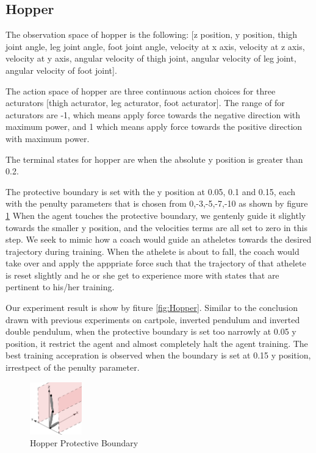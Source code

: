 \documentclass[journal]{IEEEtran}
\begin{document}
\subsection{Hopper}
The observation space of hopper is the following: [z position, y position, thigh joint angle, leg joint angle, foot joint angle, velocity at x axis, velocity at z axis, velocity at y axis, angular velocity of thigh joint, angular velocity of leg joint, angular velocity of foot joint].

The action space of hopper are three continuous action choices for three acturators [thigh acturator, leg acturator, foot acturator]. The range of for acturators are -1, which means apply force towards the negative direction with maximum power, and 1 which means apply force towards the positive direction with maximum power.

The terminal states for hopper are when the absolute y position is greater than 0.2.

The protective boundary is set with the y position at 0.05, 0.1 and 0.15, each with the penulty parameters that is chosen from 0,-3,-5,-7,-10 as shown by figure \ref{fig:hopperPB} When the agent touches the protective boundary, we gentenly guide it slightly towards the smaller y position, and the velocities terms are all set to zero in this step. We seek to mimic how a coach would guide an atheletes towards the desired trajectory during training. When the athelete is about to fall, the coach would take over and apply the apppriate force such that the trajectory of that athelete is reset slightly and he or she get to experience more with states that are pertinent to his/her training.

Our experiment result is show by fiture \ref{fig:Hopper}. Similar to the conclusion drawn with previous experiments on cartpole, inverted pendulum and inverted double pendulum, when the protective boundary is set too narrowly at 0.05 y position, it restrict the agent and almost completely halt the agent training. The best training accepration is observed when the boundary is set at 0.15 y position, irrestpect of the penulty parameter.

\begin{figure}
     \centering
      \includegraphics[width=0.2\textwidth]{hopper.png}
      \caption{Hopper Protective Boundary}
      \label{fig:hopperPB}
\end{figure}
\end{document}

